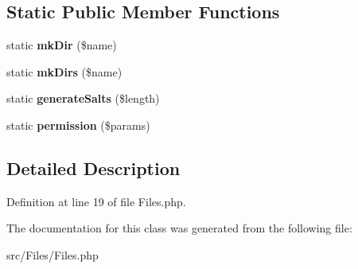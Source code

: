 \subsection*{Static Public Member Functions}
\begin{DoxyCompactItemize}
\item 
\mbox{\label{class_zest_1_1_files_1_1_files_a77ea4374bf6ba7e23ce63c651bf543d9}} 
static {\bfseries mk\+Dir} (\$name)
\item 
\mbox{\label{class_zest_1_1_files_1_1_files_afde187485b80e50e2d13ddb81072a7af}} 
static {\bfseries mk\+Dirs} (\$name)
\item 
\mbox{\label{class_zest_1_1_files_1_1_files_a991cb545814a29d8593b1c46c2a8648f}} 
static {\bfseries generate\+Salts} (\$length)
\item 
\mbox{\label{class_zest_1_1_files_1_1_files_a901445ec938f641e498ec9069f317efc}} 
static {\bfseries permission} (\$params)
\end{DoxyCompactItemize}


\subsection{Detailed Description}


Definition at line 19 of file Files.\+php.



The documentation for this class was generated from the following file\+:\begin{DoxyCompactItemize}
\item 
src/\+Files/Files.\+php\end{DoxyCompactItemize}
